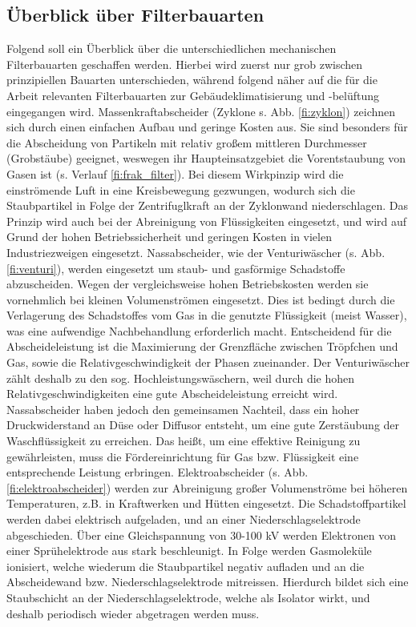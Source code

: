 \subsection{Überblick über Filterbauarten}
\label{sec:filterbauarten}
Folgend soll ein Überblick über die unterschiedlichen mechanischen Filterbauarten geschaffen werden. Hierbei wird zuerst nur grob zwischen prinzipiellen Bauarten unterschieden, während folgend näher auf die für die Arbeit relevanten Filterbauarten zur Gebäudeklimatisierung und -belüftung eingegangen wird.
\newline
Massenkraftabscheider (Zyklone s. Abb. \ref{fi:zyklon}) zeichnen sich durch einen einfachen Aufbau und geringe Kosten aus. Sie sind besonders für die Abscheidung von Partikeln mit relativ großem mittleren Durchmesser (Grobstäube) geeignet, weswegen ihr Haupteinsatzgebiet die Vorentstaubung von Gasen ist (s. Verlauf \ref{fi:frak_filter}). Bei diesem Wirkpinzip wird die einströmende Luft in eine Kreisbewegung gezwungen, wodurch sich die Staubpartikel in Folge der Zentrifuglkraft an der Zyklonwand niederschlagen. Das Prinzip wird auch bei der Abreinigung von Flüssigkeiten eingesetzt, und wird auf Grund der hohen Betriebssicherheit und geringen Kosten in vielen Industriezweigen eingesetzt.\cite{immission} \newline
Nassabscheider, wie der Venturiwäscher (s. Abb. \ref{fi:venturi}), werden eingesetzt um staub- und gasförmige Schadstoffe abzuscheiden. Wegen der vergleichsweise hohen Betriebskosten werden sie vornehmlich bei kleinen Volumenströmen eingesetzt. Dies ist bedingt durch die Verlagerung des Schadstoffes vom Gas in die genutzte Flüssigkeit (meist Wasser), was eine aufwendige Nachbehandlung erforderlich macht. Entscheidend für die Abscheideleistung ist die Maximierung der Grenzfläche zwischen Tröpfchen und Gas, sowie die Relativgeschwindigkeit der Phasen zueinander. Der Venturiwäscher zählt deshalb zu den sog. Hochleistungswäschern, weil durch die hohen Relativgeschwindigkeiten eine gute Abscheideleistung erreicht wird. Nassabscheider haben jedoch den gemeinsamen Nachteil, dass ein hoher Druckwiderstand an Düse oder Diffusor entsteht, um eine gute Zerstäubung der Waschflüssigkeit zu erreichen. Das heißt, um eine effektive Reinigung zu gewährleisten, muss die Fördereinrichtung für Gas bzw. Flüssigkeit eine entsprechende Leistung erbringen. \cite{immission} \newline
Elektroabscheider (s. Abb. \ref{fi:elektroabscheider}) werden zur Abreinigung großer Volumenströme bei höheren Temperaturen, z.B. in Kraftwerken und Hütten eingesetzt. Die Schadstoffpartikel werden dabei elektrisch aufgeladen, und an einer Niederschlagselektrode abgeschieden. \cite{immission} Über eine Gleichspannung von 30-100 kV werden Elektronen von einer Sprühelektrode aus stark beschleunigt. In Folge werden Gasmoleküle ionisiert, welche wiederum die Staubpartikel negativ aufladen und an die Abscheidewand bzw. Niederschlagselektrode mitreissen. \cite{immission}Hierdurch bildet sich eine Staubschicht an der Niederschlagselektrode, welche als Isolator wirkt, und deshalb periodisch wieder abgetragen werden muss. \newline
